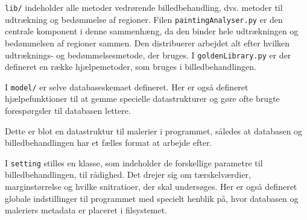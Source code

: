 {\texttt{lib/} indeholder alle metoder vedrørende billedbehandling, dvs.
metoder til udtrækning og bedømmelse af regioner. Filen
\texttt{paintingAnalyser.py} er den centrale komponent i denne
sammenhæng, da den binder hele udtrækningen og bedømmelsen af regioner
sammen. Den distribuerer arbejdet alt efter hvilken udtræknings- og
bedømmelsesmetode, der bruges.  I \texttt{goldenLibrary.py} er der
defineret en række hjælpemetoder, som bruges i billedbehandlingen.

\vspace{1.4em}
\vspace{1.4em}

I \texttt{model/} er selve databaseskemaet defineret. Her er også
defineret hjælpefunktioner til at gemme specielle datastrukturer og
gøre ofte brugte forespørgsler til databasen lettere.

\vspace{1.4em}
\vspace{1.4em}

Dette er blot en datastruktur til malerier i programmet, således at
databasen og billedbehandlingen har et fælles format at arbejde efter.

\vspace{1.4em}
\vspace{1.4em}

I \texttt{setting} stilles en klasse, som indeholder de forskellige
parametre til billedbehandlingen, til rådighed. Det drejer sig om
tærskelværdier, marginstørrelse og hvilke snitratioer, der skal
undersøges. Her er også defineret globale indstillinger til programmet
med specielt henblik på, hvor databasen og maleriers metadata er
placeret i filsystemet.

}

